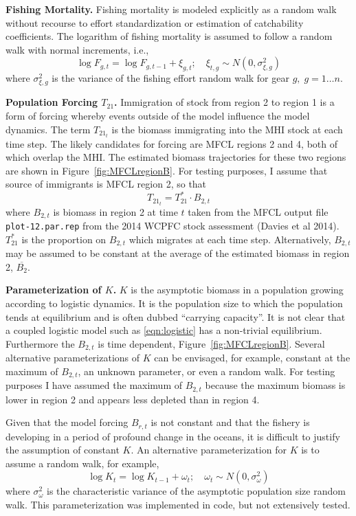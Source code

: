 \documentclass[12pt,letterpaper]{article}
\newcommand\widebar[1]{\overline{#1}}
\begin{document}
{\bf Fishing Mortality.}
Fishing mortality is
modeled explicitly as a random walk
without recourse to effort standardization or
estimation of catchability coefficients. The logarithm of fishing
mortality is assumed to
follow a random walk with normal increments, i.e.,
\begin{equation}
\log F_{g,t} = \log F_{g,t-1} + \xi_{g,t};\quad \xi_{t,g}\sim
N(0,\sigma^2_{\xi,g}) \label{eqn:Fwalk}
\end{equation}
where  $\sigma^2_{\xi,g}$ is the variance of the fishing
effort random walk for gear $g,\; g=1\ldots n$.

{\bf Population Forcing $T_{21}$.}
Immigration of stock from region 2 to region 1 is a
form of forcing whereby events outside of the model influence the
model dynamics. The term $T_{{21}_t}$ is the biomass immigrating
into the MHI stock at each time step. 
The likely candidates for forcing are MFCL regions 2 and 4, both of
which overlap the MHI. The estimated biomass trajectories for these
two regions are shown in Figure~\ref{fig:MFCLregionB}.
For testing purposes,
I assume that source of immigrants is MFCL region 2, so that
\begin{equation}
T_{{21}_t} = T^*_{21}\cdot B_{2,t}
\end{equation}
where $B_{2,t}$ is biomass in region 2 at time $t$ taken from the MFCL output file
{\tt plot-12.par.rep} from the 2014 WCPFC stock assessment
(Davies et al 2014). $T^*_{21}$ is the proportion on
$B_{2,t}$ which migrates at each time step.
Alternatively, $B_{2,t}$ may be assumed to be constant at the average
of the estimated biomass in region 2, $\widebar{B_{2}}$.

{\bf Parameterization of $K$.}
$K$ is the asymptotic biomass in a population growing according to
logistic dynamics. It is the population size to which the population
tends at equilibrium and is often dubbed ``carrying capacity''. 
It is not clear that a coupled logistic model such as
\ref{eqn:logistic} has a non-trivial equilibrium. Furthermore the
$B_{2,t}$ is time dependent, Figure~\ref{fig:MFCLregionB}.
Several alternative
parameterizations of $K$ can be envisaged, for example, constant at
the maximum of $B_{2,t}$, an unknown parameter, or even a random walk.
For testing purposes I have assumed the maximum of $B_{2,t}$ because
the maximum biomass is lower in region 2 and appears less depleted
than in region 4.

Given that the model forcing $B_{r,t}$ is not constant and that the
fishery is developing in a period of profound change in the oceans,
it is difficult to justify the assumption of constant $K$. An
alternative parameterization for $K$ is to assume a random walk, for
example,
\begin{equation}
\log K_t = \log K_{t-1} + \omega_t;\quad \omega_t\sim
N(0,\sigma^2_\omega) \label{eqn:Kwalk}
\end{equation}
where  $\sigma^2_\omega$ is the characteristic variance of the
asymptotic population size random walk.
This parameterization was implemented in code, but not extensively
tested.
\end{document}
